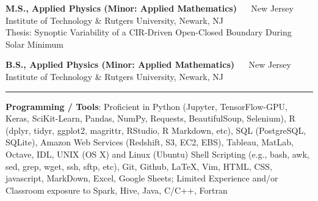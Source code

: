 \documentclass[10pt]{article}
\newcommand{\ressection}[1]{\noindent{\large\textbf{#1}}
\vspace{2pt}\hrule\vspace{4pt}}
\newcommand{\leftandright}[2]{\noindent\textbf{#1}\hfill
\textbf{#2}}
\begin{document}
\leftandright{M.S., Applied Physics (Minor: Applied Mathematics)}{$\quad$}%
\indent New Jersey Institute of Technology \& Rutgers University, Newark, NJ\\  
\indent Thesis: Synoptic Variability of a CIR-Driven Open-Closed Boundary During Solar Minimum


\leftandright{B.S., Applied Physics (Minor: Applied Mathematics)}{$\quad$}%
\indent New Jersey Institute of Technology \& Rutgers University, Newark, NJ\\  




\vspace{0.5cm}
\ressection{Computing Skills}
\noindent\textbf{Programming / Tools}: Proficient in Python  
(Jupyter, TensorFlow-GPU, Keras, SciKit-Learn, Pandas, NumPy, Requests,
BeautifulSoup, Selenium), R (dplyr, tidyr,
ggplot2, magrittr, RStudio, R Markdown, etc), SQL (PostgreSQL, SQLite),
Amazon Web Services (Redshift, S3, EC2, EBS), Tableau, MatLab, Octave, IDL, 
UNIX (OS X) and Linux (Ubuntu) Shell Scripting (e.g., bash, awk, sed,
grep, wget, ssh, sftp, etc), Git, Github, 
LaTeX, Vim, HTML, CSS, javascript, MarkDown, Excel, Google Sheets; 
Limited Experience and/or Classroom exposure to Spark, Hive, Java, C/C++, Fortran
  \vspace{0.1in}
\end{document}
